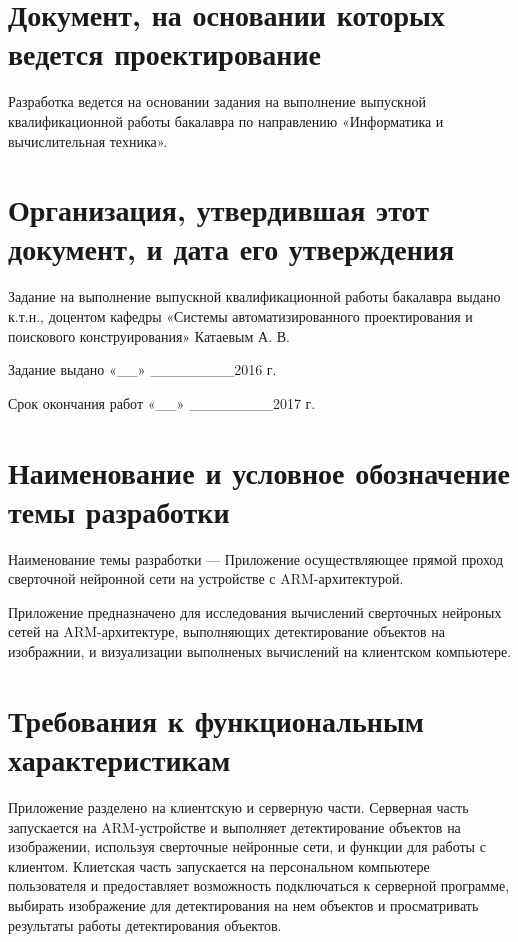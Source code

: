 \documentclass[a4paper,english]{G2-105}
\begin{document}
\ttl
\section{Документ, на основании которых ведется проектирование}
\par Разработка ведется на основании задания на выполнение выпускной квалификационной работы бакалавра по направлению «Информатика и вычислительная техника».

\section{Организация, утвердившая этот документ, и дата его утверждения}
Задание на выполнение выпускной квалификационной работы бакалавра выдано к.т.н., доцентом кафедры «Системы автоматизированного проектирования и поискового конструирования» Катаевым А. В.
\par Задание выдано «\_\_» \_\_\_\_\_\_\_\_2016 г.
\par Срок окончания работ «\_\_» \_\_\_\_\_\_\_\_2017 г.


\section{Наименование и условное обозначение темы разработки}
\par Наименование темы разработки --- Приложение осуществляющее прямой проход сверточной нейронной сети на устройстве с ARM-архитектурой.

\par Приложение предназначено для исследования вычислений сверточных нейроных сетей на ARM-архитектуре, выполняющих детектирование объектов на изображнии, и визуализации выполненых вычислений на клиентском компьютере.

\section{Требования к функциональным характеристикам}
\par Приложение разделено на клиентскую и серверную части. Серверная часть запускается на ARM-устройстве и выполняет детектирование объектов на изображении, используя сверточные нейронные сети, и функции для работы с клиентом. Клиетская часть запускается на персональном компьютере пользователя и предоставляет возможность подключаться к серверной программе, выбирать изображение для детектирования на нем объектов и просматривать результаты работы детектирования объектов. 
\end{document}
